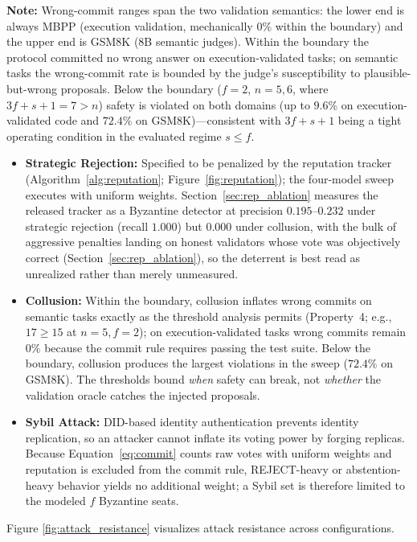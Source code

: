 \documentclass{article}
\begin{document}
\textbf{Note:} Wrong-commit ranges span the two validation semantics: the lower end is always MBPP (execution validation, mechanically $0\%$ within the boundary) and the upper end is GSM8K (8B semantic judges). Within the boundary the protocol committed no wrong answer on execution-validated tasks; on semantic tasks the wrong-commit rate is bounded by the judge's susceptibility to plausible-but-wrong proposals. Below the boundary ($f{=}2$, $n{=}5,6$, where $3f{+}s{+}1 = 7 > n$) safety is violated on both domains (up to $9.6\%$ on execution-validated code and $72.4\%$ on GSM8K)---consistent with $3f{+}s{+}1$ being a tight operating condition in the evaluated regime $s \le f$.

\begin{itemize}
    \item \textbf{Strategic Rejection:} Specified to be penalized by the reputation tracker (Algorithm~\ref{alg:reputation}; Figure~\ref{fig:reputation}); the four-model sweep executes with uniform weights. Section~\ref{sec:rep_ablation} measures the released tracker as a Byzantine detector at precision $0.195$--$0.232$ under strategic rejection (recall $1.000$) but $0.000$ under collusion, with the bulk of aggressive penalties landing on honest validators whose vote was objectively correct (Section~\ref{sec:rep_ablation}), so the deterrent is best read as unrealized rather than merely unmeasured.
    \item \textbf{Collusion:} Within the boundary, collusion inflates wrong commits on semantic tasks exactly as the threshold analysis permits (Property~4; e.g., $17 \geq 15$ at $n{=}5, f{=}2$); on execution-validated tasks wrong commits remain $0\%$ because the commit rule requires passing the test suite. Below the boundary, collusion produces the largest violations in the sweep ($72.4\%$ on GSM8K). The thresholds bound \emph{when} safety can break, not \emph{whether} the validation oracle catches the injected proposals.
    \item \textbf{Sybil Attack:} DID-based identity authentication prevents identity replication, so an attacker cannot inflate its voting power by forging replicas. Because Equation~\ref{eq:commit} counts raw votes with uniform weights and reputation is excluded from the commit rule, REJECT-heavy or abstention-heavy behavior yields no additional weight; a Sybil set is therefore limited to the modeled $f$ Byzantine seats.
\end{itemize}

Figure \ref{fig:attack_resistance} visualizes attack resistance across configurations.
\end{document}
